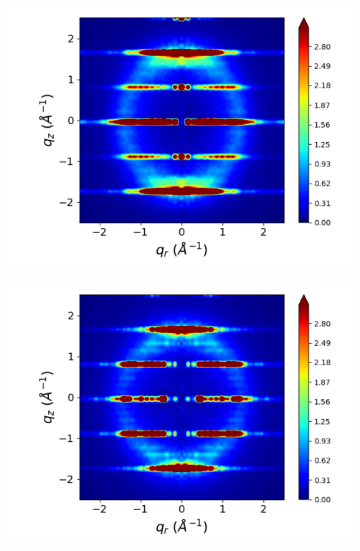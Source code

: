 \documentclass[journal=jpcbfk,manuscript=article]{achemso}
\begin{document}
\begin{figure}[!htb]
\begin{subfigure}{0.3\linewidth}
  	\label{fig:rotated_monomers_rzplot_restrained}
  \end{subfigure}
  \begin{subfigure}{0.3\linewidth}
  	\centering
  	\includegraphics[width=\textwidth]{staggered_rzplot_restrained.pdf}
  	\label{fig:staggered_rzplot_restrained}
  \end{subfigure}
  \begin{subfigure}{0.3\linewidth}
  	\centering
  	\includegraphics[width=\textwidth]{solvated_pore_rzplot_restrained.pdf}
  	\label{fig:solvated_pore_rzplot_restrained}
  \end{subfigure}

\end{figure}
\end{document}
